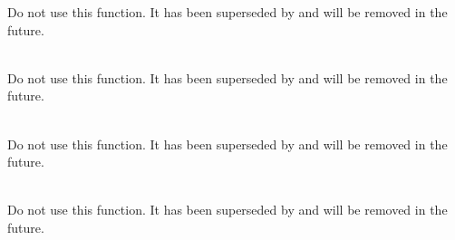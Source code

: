 \begin{DoxyRefList}
Do not use this function. It has been superseded by  and will be removed in the future.  
\item[Global \doxylink{group___complex_f_f_t_ga55b424341dc3efd3fa0bcaaff4bdbf40}{arm\+\_\+cfft\+\_\+radix2\+\_\+q15} (const \doxylink{structarm__cfft__radix2__instance__q15}{arm\+\_\+cfft\+\_\+radix2\+\_\+instance\+\_\+q15} \texorpdfstring{$\ast$}{*}S, \doxylink{arm__math__types_8h_ab5a8fb21a5b3b983d5f54f31614052ea}{q15\+\_\+t} \texorpdfstring{$\ast$}{*}p\+Src)]\hfill \\
\label{deprecated__deprecated000668}%
%
Do not use this function. It has been superseded by  and will be removed in the future.  
\item[Global \doxylink{group___complex_f_f_t_ga6321f703ec87a274aedaab33d3e766b4}{arm\+\_\+cfft\+\_\+radix2\+\_\+q31} (const \doxylink{structarm__cfft__radix2__instance__q31}{arm\+\_\+cfft\+\_\+radix2\+\_\+instance\+\_\+q31} \texorpdfstring{$\ast$}{*}S, \doxylink{arm__math__types_8h_adc89a3547f5324b7b3b95adec3806bc0}{q31\+\_\+t} \texorpdfstring{$\ast$}{*}p\+Src)]\hfill \\
\label{deprecated__deprecated000669}%
%
Do not use this function. It has been superseded by  and will be removed in the future.  
\item[Global \doxylink{group___complex_f_f_t_ga521f670cd9c571bc61aff9bec89f4c26}{arm\+\_\+cfft\+\_\+radix4\+\_\+f32} (const \doxylink{structarm__cfft__radix4__instance__f32}{arm\+\_\+cfft\+\_\+radix4\+\_\+instance\+\_\+f32} \texorpdfstring{$\ast$}{*}S, \doxylink{arm__math__types_8h_a4611b605e45ab401f02cab15c5e38715}{float32\+\_\+t} \texorpdfstring{$\ast$}{*}p\+Src)]\hfill \\
\label{deprecated__deprecated000670}%
%
Do not use this function. It has been superseded by  and will be removed in the future.  
\item[Global \doxylink{group___complex_f_f_t_gaf336459f684f0b17bfae539ef1b1b78a}{arm\+\_\+cfft\+\_\+radix4\+\_\+init\+\_\+f32} (\doxylink{structarm__cfft__radix4__instance__f32}{arm\+\_\+cfft\+\_\+radix4\+\_\+instance\+\_\+f32} \texorpdfstring{$\ast$}{*}S, uint16\+\_\+t fft\+Len, uint8\+\_\+t ifft\+Flag, uint8\+\_\+t bit\+Reverse\+Flag)]\hfill \\

\end{DoxyRefList}
